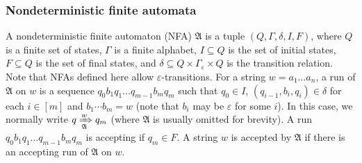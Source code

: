 \documentclass[preprint,12pt]{elsarticle}
\newcommand\Aa{{\mathcal{A} }}
\newcommand\Aut{{\mathfrak{A} }}
\newcommand{\NFA}{\textsf{NFA}}
\begin{document}
\subsubsection{Nondeterministic finite automata}



A nondeterministic finite automaton (\NFA) $\Aut$ is a tuple $(Q, \Gamma, \delta, I, F)$, where $Q$ is a finite set of states, $\Gamma$ is a finite alphabet, $I \subseteq Q$ is the set of initial states, $F \subseteq Q$ is the set of final states, and $\delta \subseteq Q \times \Gamma_\varepsilon \times Q$ is the transition relation. Note that {\NFA}s defined here allow $\varepsilon$-transitions.
%
For a string $w = a_1 \dots a_n$, a run of $\Aut$ on $w$ is a sequence $q_0 b_1q_1 \dots q_{m-1} b_m q_m$ such that $q_0 \in I$,  $(q_{i-1}, b_i, q_i) \in \delta$ for each $i \in [m]$ and $b_1 \cdots b_m = w$ (note that $b_i$ may be $\varepsilon$ for some $i$). In this case, we normally write $q \xRightarrow[\Aut]{w} q_m$ 
(where $\Aut$ is usually omitted %
for brevity).
%
A run $q_0 b_1q_1 \dots q_{m-1} b_m q_m$ is accepting if $q_m \in F$. A string $w$ is accepted by $\Aut$ if there is an accepting run of $\Aut$ on $w$. 
\end{document}
